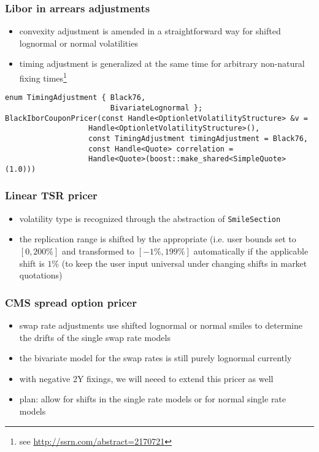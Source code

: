 \documentclass{beamer}
\begin{document}
\begin{frame}[fragile]
\frametitle{Libor in arrears adjustments}
\begin{itemize}
\item convexity adjustment is amended in a straightforward way for  shifted lognormal or normal volatilities
\item timing adjustment is generalized at the same time for arbitrary non-natural fixing times\footnote{see \url{http://ssrn.com/abstract=2170721}}
\end{itemize}
\begin{verbatim}
enum TimingAdjustment { Black76,
                        BivariateLognormal };
BlackIborCouponPricer(const Handle<OptionletVolatilityStructure> &v =
                   Handle<OptionletVolatilityStructure>(),
                   const TimingAdjustment timingAdjustment = Black76,
                   const Handle<Quote> correlation =
                   Handle<Quote>(boost::make_shared<SimpleQuote>(1.0)))
\end{verbatim}
\end{frame}

\begin{frame}[fragile]
\frametitle{Linear TSR pricer}
\begin{itemize}
\item volatility type is recognized through the abstraction of \verb+SmileSection+
\item the replication range is shifted by the appropriate (i.e. user bounds set to $[0,200\%]$ and transformed to $[-1\%,199\%]$ automatically if the applicable shift is $1\%$ (to keep the user input universal under changing shifts in market quotations)
\end{itemize}
\end{frame}

\begin{frame}[fragile]
\frametitle{CMS spread option pricer}
\begin{itemize}
\item swap rate adjustments use shifted lognormal or normal smiles to determine the drifts of the single swap rate models
\item the bivariate model for the swap rates is still purely lognormal currently
\item with negative 2Y fixings, we will neeed to extend this pricer as well
\item plan: allow for shifts in the single rate models or for normal single rate models
\end{itemize}
\end{frame}
\end{document}
